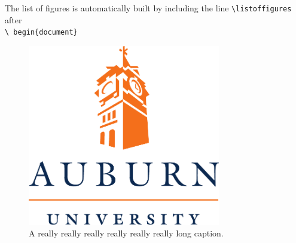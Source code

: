 \documentclass[12pt]{article}
\begin{document}
\LARGE
\listoffigures
\vspace{36pt}
The list of figures is automatically built by including the line
\texttt{\textbackslash listoffigures} after\\ \texttt{\textbackslash
begin\{document\}}
\begin{figure}[htbp]
  \centering
  \includegraphics[width=0.75\textwidth]{aulogo.pdf}
  \caption{\large A really really really really really really long caption.}
  \label{fig:aulogo}
\end{figure}
\end{document}

